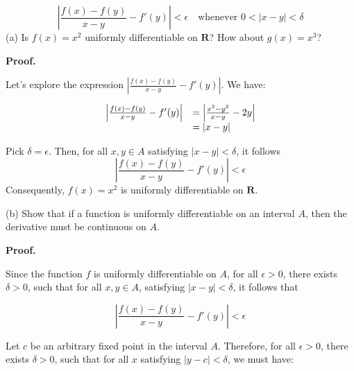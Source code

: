 \documentclass[10pt]{article}
\begin{document}
\begin{equation*}
\left| \frac{f( x) -f( y)}{x-y} -f'( y)\right| < \epsilon \quad \text{whenever } 0< |x-y|< \delta 
\end{equation*}
(a) Is $\displaystyle f( x) =x^{2}$ uniformly differentiable on $\displaystyle \mathbf{R}$? How about $\displaystyle g( x) =x^{3}$?



\textbf{Proof.}

Let's explore the expression $\displaystyle \left| \frac{f( x) -f( y)}{x-y} -f'( y)\right| $. We have:


\begin{equation*}
\begin{array}{ c l }
\left| \frac{f( x) -f( y)}{x-y} -f'( y)\right|  & =\left| \frac{x^{2} -y^{2}}{x-y} -2y\right| \\
 & =| x-y| 
\end{array}
\end{equation*}


Pick $\displaystyle \delta =\epsilon $. Then, for all $\displaystyle x,y\in A$ satisfying $\displaystyle |x-y|< \delta $, it follows 
\begin{equation*}
\left| \frac{f( x) -f( y)}{x-y} -f'( y)\right| < \epsilon 
\end{equation*}
Consequently, $\displaystyle f( x) =x^{2}$ is uniformly differentiable on $\displaystyle \mathbf{R}$.





(b) Show that if a function is uniformly differentiable on an interval $\displaystyle A$, then the derivative must be continuous on $\displaystyle A$.

\textbf{Proof.}



Since the function $\displaystyle f$ is uniformly differentiable on $\displaystyle A$, for all $\displaystyle \epsilon  >0$, there exists $\displaystyle \delta  >0$, such that for all $\displaystyle x,y\in A$, satisfying $\displaystyle |x-y|< \delta $, it follows that 


\begin{equation*}
\left| \frac{f( x) -f( y)}{x-y} -f'( y)\right| < \epsilon 
\end{equation*}


Let $\displaystyle c$ be an arbitrary fixed point in the interval $\displaystyle A$. Therefore, for all $\displaystyle \epsilon  >0$, there exists $\displaystyle \delta  >0$, such that for all $\displaystyle x$ satisfying $\displaystyle |y-c|< \delta $, we must have:
\end{document}
